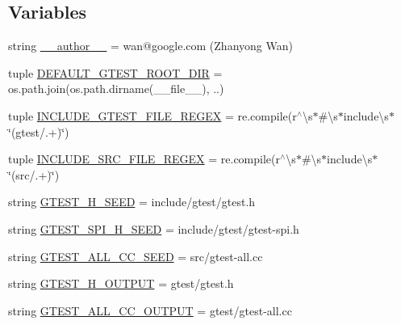 \subsection*{Variables}
\begin{DoxyCompactItemize}
\item 
string \hyperlink{namespacefuse__gtest__files_a33bf00338164b922cf67f159e3cded19}{\+\_\+\+\_\+author\+\_\+\+\_\+} = \textquotesingle{}wan@google.\+com (Zhanyong Wan)\textquotesingle{}
\item 
tuple \hyperlink{namespacefuse__gtest__files_a082a3579288a4359dbf6ad10a74e1726}{D\+E\+F\+A\+U\+L\+T\+\_\+\+G\+T\+E\+S\+T\+\_\+\+R\+O\+O\+T\+\_\+\+D\+I\+R} = os.\+path.\+join(os.\+path.\+dirname(\+\_\+\+\_\+file\+\_\+\+\_\+), \textquotesingle{}..\textquotesingle{})
\item 
tuple \hyperlink{namespacefuse__gtest__files_a726853d43863f4f03df04d2fbc3e5d12}{I\+N\+C\+L\+U\+D\+E\+\_\+\+G\+T\+E\+S\+T\+\_\+\+F\+I\+L\+E\+\_\+\+R\+E\+G\+E\+X} = re.\+compile(r\textquotesingle{}$^\wedge$\textbackslash{}s$\ast$\#\textbackslash{}s$\ast$include\textbackslash{}s$\ast$\char`\"{}(gtest/.+)\char`\"{}\textquotesingle{})
\item 
tuple \hyperlink{namespacefuse__gtest__files_ada118f67eab8eccd71bfac9e6508245b}{I\+N\+C\+L\+U\+D\+E\+\_\+\+S\+R\+C\+\_\+\+F\+I\+L\+E\+\_\+\+R\+E\+G\+E\+X} = re.\+compile(r\textquotesingle{}$^\wedge$\textbackslash{}s$\ast$\#\textbackslash{}s$\ast$include\textbackslash{}s$\ast$\char`\"{}(src/.+)\char`\"{}\textquotesingle{})
\item 
string \hyperlink{namespacefuse__gtest__files_ad897bce28100f2b97216929013519181}{G\+T\+E\+S\+T\+\_\+\+H\+\_\+\+S\+E\+E\+D} = \textquotesingle{}include/gtest/gtest.\+h\textquotesingle{}
\item 
string \hyperlink{namespacefuse__gtest__files_a891d03ce9cfe3577cb4c193f9544f17f}{G\+T\+E\+S\+T\+\_\+\+S\+P\+I\+\_\+\+H\+\_\+\+S\+E\+E\+D} = \textquotesingle{}include/gtest/gtest-\/spi.\+h\textquotesingle{}
\item 
string \hyperlink{namespacefuse__gtest__files_a162a6031d0d5743a37a4f79227d5e916}{G\+T\+E\+S\+T\+\_\+\+A\+L\+L\+\_\+\+C\+C\+\_\+\+S\+E\+E\+D} = \textquotesingle{}src/gtest-\/all.\+cc\textquotesingle{}
\item 
string \hyperlink{namespacefuse__gtest__files_a16437f87d0f7a9800885a9082a0b773e}{G\+T\+E\+S\+T\+\_\+\+H\+\_\+\+O\+U\+T\+P\+U\+T} = \textquotesingle{}gtest/gtest.\+h\textquotesingle{}
\item 
string \hyperlink{namespacefuse__gtest__files_aa66c14474599109c46ec24eaa0ad4217}{G\+T\+E\+S\+T\+\_\+\+A\+L\+L\+\_\+\+C\+C\+\_\+\+O\+U\+T\+P\+U\+T} = \textquotesingle{}gtest/gtest-\/all.\+cc\textquotesingle{}
\end{DoxyCompactItemize}


